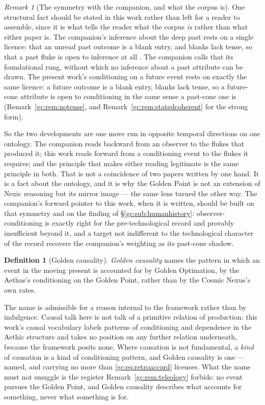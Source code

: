 \documentclass[11pt]{article}
\numberwithin{equation}{section}
\theoremstyle{plain}
\theoremstyle{definition}
\newtheorem{definition}[theorem]{Definition}
\theoremstyle{remark}
\newtheorem{remark}[theorem]{Remark}
\begin{document}
\begin{remark}[The symmetry with the companion, and what the corpus is]
\label{gc:rem:rungzero}
One structural fact should be stated in this work rather than left for a
reader to assemble, since it is what tells the reader what the corpus
\emph{is} rather than what either paper is. The companion's inference about the deep past rests on a single licence:
that an unread past outcome is a blank entry, and blanks lack tense, so
that a past fluke is open to inference at all
\cite{Aethus, NexicFoundation}. The companion calls that its
foundational rung, without which no inference about a past attribute can
be drawn. The present work's conditioning on a future event rests on
exactly the same licence: a future outcome is a blank entry, blanks lack
tense, so a future-cone attribute is open to conditioning in the same
sense a past-cone one is (Remark~\ref{gc:rem:notense}, and
Remark~\ref{gc:rem:statedcoherent} for the strong form).

So the two developments are one move run in opposite temporal directions
on one ontology. The companion reads backward from an observer to the
flukes that produced it; this work reads forward from a conditioning
event to the flukes it requires; and the principle that makes either
reading legitimate is the same principle in both. That is not a
coincidence of two papers written by one hand. It is a fact about the
ontology, and it is why the Golden Point is not an extension of Nexic
reasoning but its mirror image --- the same lens turned the other way.
The companion's forward pointer to this work, when it is written, should
be built on that symmetry and on the finding of
\S\ref{gc:sub:humanhistory}: observer-conditioning is exactly right for
the pre-technological record and provably insufficient beyond it, and a
target not indifferent to the technological character of the record
recovers the companion's weighting as its past-cone shadow.
\end{remark}

\begin{definition}[Golden causality]\label{gc:def:goldencausality}
\emph{Golden causality} names the pattern in which an event in the moving
present is accounted for by Golden Optimation, by the Aethus's
conditioning on the Golden Point, rather than by the Cosmic Nexus's
own rates.
\end{definition}

The name is admissible for a reason internal to the framework rather than
by indulgence. Causal talk here is not talk of a primitive relation of
production: this work's causal vocabulary labels patterns of conditioning
and dependence in the Aethic structure and takes no position on any
further relation underneath, because the framework posits none. Where
causation is not fundamental, a \emph{kind} of causation is a kind of
conditioning pattern, and Golden causality is one --- named, and carrying
no more than \eqref{gc:eq:retroaccord} licenses. What the name must not
smuggle is the register Remark~\ref{gc:rem:teleology} forbids: no event
pursues the Golden Point, and Golden causality describes what accounts
for something, never what something is for.
\end{document}

